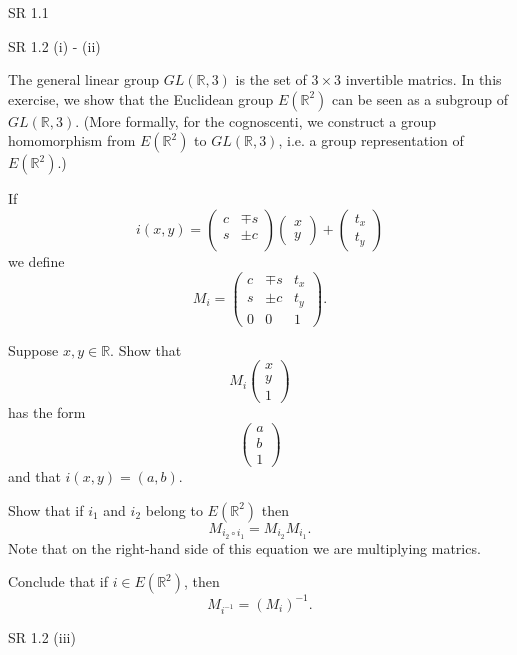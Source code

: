 \documentclass[minion]{homework}
\newcommand{\Reals}{\mathbb{R}}
\begin{document}
\begin{aproblems}

\hproblem SR 1.1

\hproblem SR 1.2 (i) - (ii)

\hproblem The general linear group $GL(\Reals,3)$ is the set of $3\times 3$ invertible matrics.
In this exercise, we show that the Euclidean group $E(\Reals^2)$ can be seen as a subgroup of $GL(\Reals,3)$. (More formally, for the cognoscenti, we construct
a group homomorphism from $E(\Reals^2)$ to $GL(\Reals,3)$, i.e.
a group representation of $E(\Reals^2)$.)

If
\begin{equation}
i(x,y) = \begin{pmatrix} c & \mp s  \\
s & \pm c \\
\end{pmatrix} \begin{pmatrix} x \\ y \end{pmatrix} +\begin{pmatrix} t_x \\ t_y \end{pmatrix}
\end{equation}
we define
\begin{equation}
M_i = \begin{pmatrix} c & \mp s & t_x \\
s & \pm c & t_y \\
0 &  0 & 1\end{pmatrix}.
\end{equation}
\begin{subproblems}
\item Suppose $x,y\in \Reals$. Show that 
\begin{equation}
M_i \begin{pmatrix} x \\ y \\ 1 \end{pmatrix}
\end{equation}
has the form
\begin{equation}
\begin{pmatrix} a \\ b \\ 1 \end{pmatrix}
\end{equation}
and that $i(x,y)=(a,b)$.
\item Show that if $i_1$ and $i_2$ belong to $E(\Reals^2)$ then
\begin{equation}
M_{i_2\circ i_1} = M_{i_2} M_{i_1}.
\end{equation}
Note that on the right-hand side of this equation we are multiplying matrics.
\item  Conclude that if $i\in E(\Reals^2)$, then
\begin{equation}
M_{i^{-1}} = (M_i)^{-1}.
\end{equation}
\end{subproblems}

 SR 1.2 (iii)

\end{aproblems}
\end{document}
